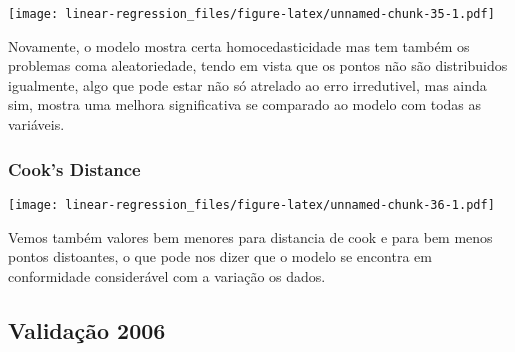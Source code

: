 \documentclass[]{article}
\newenvironment{Shaded}{\begin{snugshade}}{\end{snugshade}}
\newcommand{\KeywordTok}[1]{\textcolor[rgb]{0.13,0.29,0.53}{\textbf{#1}}}
\newcommand{\DataTypeTok}[1]{\textcolor[rgb]{0.13,0.29,0.53}{#1}}
\newcommand{\DecValTok}[1]{\textcolor[rgb]{0.00,0.00,0.81}{#1}}
\newcommand{\StringTok}[1]{\textcolor[rgb]{0.31,0.60,0.02}{#1}}
\newcommand{\OtherTok}[1]{\textcolor[rgb]{0.56,0.35,0.01}{#1}}
\newcommand{\OperatorTok}[1]{\textcolor[rgb]{0.81,0.36,0.00}{\textbf{#1}}}
\newcommand{\NormalTok}[1]{#1}
\begin{document}
\texttt{[image: linear-regression\_files/figure-latex/unnamed-chunk-35-1.pdf]}

Novamente, o modelo mostra certa homocedasticidade mas tem também os
problemas coma aleatoriedade, tendo em vista que os pontos não são
distribuidos igualmente, algo que pode estar não só atrelado ao erro
irredutivel, mas ainda sim, mostra uma melhora significativa se
comparado ao modelo com todas as variáveis.

\subsubsection{Cook's Distance}\label{cooks-distance-1}

\begin{Shaded}
\end{Shaded}

\texttt{[image: linear-regression\_files/figure-latex/unnamed-chunk-36-1.pdf]}

Vemos também valores bem menores para distancia de cook e para bem menos
pontos distoantes, o que pode nos dizer que o modelo se encontra em
conformidade considerável com a variação os dados.

\subsection{Validação 2006}\label{validacao-2006-1}
\end{document}
